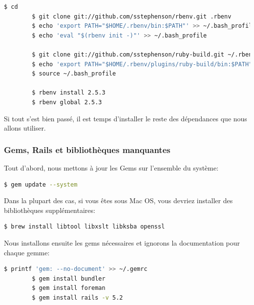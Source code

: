 \documentclass[]{report}
\begin{document}
        \begin{scriptsize}
        \begin{lstlisting}[language=bash]
        $ cd
        $ git clone git://github.com/sstephenson/rbenv.git .rbenv
        $ echo 'export PATH="$HOME/.rbenv/bin:$PATH"' >> ~/.bash_profile
        $ echo 'eval "$(rbenv init -)"' >> ~/.bash_profile

        $ git clone git://github.com/sstephenson/ruby-build.git ~/.rbenv/plugins/ruby-build
        $ echo 'export PATH="$HOME/.rbenv/plugins/ruby-build/bin:$PATH"' >> ~/.bash_profile
        $ source ~/.bash_profile

        $ rbenv install 2.5.3
        $ rbenv global 2.5.3
        \end{lstlisting}
        \end{scriptsize}

        Si tout s'est bien passé, il est temps d'installer le reste des dépendances que nous allons utiliser.

      \subsubsection{Gems, Rails et bibliothèques manquantes}

        Tout d'abord, nous mettons à jour les Gems sur l'ensemble du système:

        \begin{scriptsize}
        \begin{lstlisting}[language=bash]
        $ gem update --system
        \end{lstlisting}
        \end{scriptsize}

        Dans la plupart des cas, si vous êtes sous Mac OS, vous devriez installer des bibliothèques supplémentaires:

        \begin{scriptsize}
        \begin{lstlisting}[language=bash]
        $ brew install libtool libxslt libksba openssl
        \end{lstlisting}
        \end{scriptsize}

        Nous installons ensuite les gems nécessaires et ignorons la documentation pour chaque gemme:

        \begin{scriptsize}
        \begin{lstlisting}[language=bash]
        $ printf 'gem: --no-document' >> ~/.gemrc
        $ gem install bundler
        $ gem install foreman
        $ gem install rails -v 5.2
        \end{lstlisting}
        \end{scriptsize}
\end{document}
